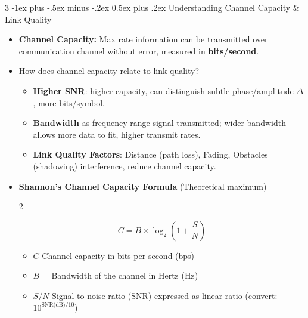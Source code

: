\documentclass[a4paper, 9pt, landscape]{extarticle}
\makeatletter
\renewcommand{\subsubsection}{\@startsection{paragraph}{4}{0mm}%
                                {-1ex plus -.5ex minus -.2ex}%
                                {0.5ex plus .2ex}%
                                {\normalfont\footnotesize\bfseries}}
\makeatother
\begin{document}
\begin{multicols*}{3}
\subsubsection{Understanding Channel Capacity \& Link Quality}
\begin{itemize}
    \item \textbf{Channel Capacity:} Max rate information can be transmitted over communication channel without error, measured in \textbf{bits/second}.
    \item How does channel capacity relate to link quality?
    \begin{itemize}
        \item \textbf{Higher SNR}: higher capacity, can distinguish subtle phase/amplitude $\Delta$, more bits/symbol.
        \item \textbf{Bandwidth} as frequency range signal transmitted; wider bandwidth allows more data to fit, higher transmit rates.
        \item \textbf{Link Quality Factors}: Distance (path loss), Fading, Obstacles (shadowing) interference, reduce channel capacity.
    \end{itemize}
    \item \textbf{Shannon's Channel Capacity Formula} (Theoretical maximum)
    \begin{multicols}{2}
      \begin{center}
        \[
          \boxed{C = B \times \log_2(1 + \frac{S}{N})}
        \]
      \end{center}
      \columnbreak
      \begin{itemize}
        \item $C$ Channel capacity in bits per second (bps)
        \item $B$ = Bandwidth of the channel in Hertz (Hz)
        \item $S/N$ Signal-to-noise ratio (SNR) expressed as linear ratio (convert: $10^{\text{SNR(dB)}/10}$)
      \end{itemize}
    \end{multicols}
\end{itemize}


\end{multicols*}
\end{document}
